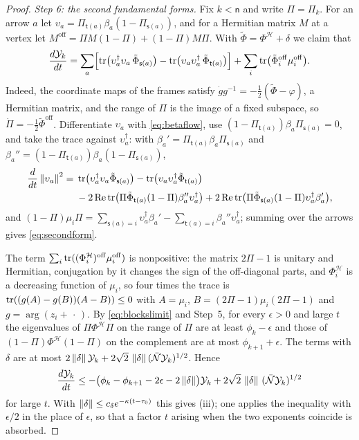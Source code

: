 \begin{proof}
\emph{Step 6: the second fundamental forms.} Fix $k<\mathsf n$ and write
$\Pi=\Pi_k$. For an arrow $a$ let
$\upsilon_a=\Pi_{\mathsf t(a)}\beta_a(1-\Pi_{\mathsf s(a)})$, and for a
Hermitian matrix $M$ at a vertex let $M^{\mathrm{off}}=\Pi M(1-\Pi)+(1-\Pi)M\Pi$.
With $\tilde\Phi=\Phi^{\mathcal H}+\delta$ we claim that
\begin{equation}\label{eq:secondform}
 \frac{d\mathcal Y_k}{dt}=\sum_a\Bigl[\operatorname{tr}\bigl(\upsilon_a^\dagger\upsilon_a\,\tilde\Phi_{\mathsf s(a)}\bigr)
 -\operatorname{tr}\bigl(\upsilon_a\upsilon_a^\dagger\,\tilde\Phi_{\mathsf t(a)}\bigr)\Bigr]
 +\sum_i\operatorname{tr}\bigl(\tilde\Phi_i^{\mathrm{off}}\mu_i^{\mathrm{off}}\bigr).
\end{equation}
Indeed, the coordinate maps of the frames satisfy
$\dot gg^{-1}=-\frac12(\tilde\Phi-\varphi)$, a Hermitian matrix, and the
range of $\Pi$ is the image of a fixed subspace, so
$\dot\Pi=-\frac12\tilde\Phi^{\mathrm{off}}$. Differentiate
$\upsilon_a$ with \eqref{eq:betaflow}, use
$(1-\Pi_{\mathsf t(a)})\beta_a\Pi_{\mathsf s(a)}=0$, and take the trace
against $\upsilon_a^\dagger$: with
$\beta_a'=\Pi_{\mathsf t(a)}\beta_a\Pi_{\mathsf s(a)}$ and
$\beta_a''=(1-\Pi_{\mathsf t(a)})\beta_a(1-\Pi_{\mathsf s(a)})$,
\begin{align*}
 \frac d{dt}\left\lVert\upsilon_a\right\rVert^2={}&\operatorname{tr}\bigl(\upsilon_a^\dagger\upsilon_a\tilde\Phi_{\mathsf s(a)}\bigr)
 -\operatorname{tr}\bigl(\upsilon_a\upsilon_a^\dagger\tilde\Phi_{\mathsf t(a)}\bigr)\\
 &-2\operatorname{Re}\operatorname{tr}\bigl(\Pi\tilde\Phi_{\mathsf t(a)}(1-\Pi)\beta_a''\upsilon_a^\dagger\bigr)
 +2\operatorname{Re}\operatorname{tr}\bigl(\Pi\tilde\Phi_{\mathsf s(a)}(1-\Pi)\upsilon_a^\dagger\beta_a'\bigr),
\end{align*}
and
$(1-\Pi)\mu_i\Pi=\sum_{\mathsf s(a)=i}\upsilon_a^\dagger\beta_a'-\sum_{\mathsf t(a)=i}\beta_a''\upsilon_a^\dagger$;
summing over the arrows gives \eqref{eq:secondform}.

The term $\sum_i\operatorname{tr}((\Phi^{\mathcal H}_i)^{\mathrm{off}}\mu_i^{\mathrm{off}})$
is nonpositive: the matrix $2\Pi-1$ is unitary and Hermitian, conjugation
by it changes the sign of the off-diagonal parts, and
$\Phi^{\mathcal H}_i$ is a decreasing function of $\mu_i$, so four times the
trace is $\operatorname{tr}((g(A)-g(B))(A-B))\leq0$ with $A=\mu_i$,
$B=(2\Pi-1)\mu_i(2\Pi-1)$ and $g=\arg(z_i+\,\cdot\,)$. By
\eqref{eq:blockslimit} and Step~5, for every $\epsilon>0$ and large $t$
the eigenvalues of $\Pi\Phi^{\mathcal H}\Pi$ on the range of $\Pi$ are at
least $\phi_k-\epsilon$ and those of $(1-\Pi)\Phi^{\mathcal H}(1-\Pi)$ on the
complement are at most $\phi_{k+1}+\epsilon$. The terms with $\delta$ are at
most $2\left\lVert\delta\right\rVert\mathcal Y_k+2\sqrt2\,\left\lVert\delta\right\rVert(\bar{\mathcal N}\mathcal Y_k)^{1/2}$.
Hence
\[
 \frac{d\mathcal Y_k}{dt}\leq-\bigl(\phi_k-\phi_{k+1}-2\epsilon-2\left\lVert\delta\right\rVert\bigr)\mathcal Y_k
 +2\sqrt2\,\left\lVert\delta\right\rVert\,(\bar{\mathcal N}\mathcal Y_k)^{1/2}
\]
for large $t$. With $\left\lVert\delta\right\rVert\leq c_\delta e^{-\kappa(t-\tau_0)}$ this
gives (iii); one applies the inequality with $\epsilon/2$ in the place of
$\epsilon$, so that a factor $t$ arising when the two exponents coincide is
absorbed.


\end{proof}
